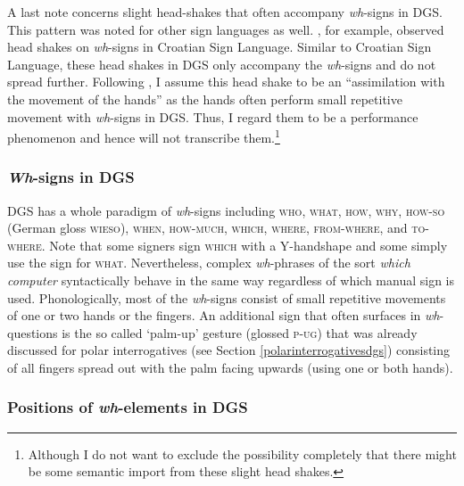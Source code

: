 A last note concerns slight head-shakes that often accompany \textit{wh}-signs in DGS. This pattern was noted for other sign languages as well. \citet[232--235]{sarac2007cross}, for example, observed head shakes on \textit{wh}-signs in Croatian Sign Language. Similar to Croatian Sign Language, these head shakes in DGS only accompany the \textit{wh}-signs and do not spread further. Following \citet[235]{sarac2007cross}, I assume this head shake to be an ``assimilation with the movement of the hands'' as the hands often perform small repetitive movement with \textit{wh}-signs in DGS. Thus, I regard them to be a performance phenomenon and hence will not transcribe them.\footnote{ Although I do not want to exclude the possibility completely that there might be some semantic import from these slight head shakes.}

\subsubsection{\textit{Wh}-signs in DGS}


DGS has a whole paradigm of \textit{wh}-signs including \textsc{who}, \textsc{what}, \textsc{how}, \textsc{why}, \textsc{how-so} (German gloss \textsc{wieso}), \textsc{when}, \textsc{how-much}, \textsc{which}, \textsc{where}, \textsc{from-where}, and \textsc{to-where}. Note that some signers sign \textsc{which} with a Y-handshape and some simply use the sign for \textsc{what}. Nevertheless, complex \textit{wh}-phrases of the sort \textit{which computer} syntactically behave in the same way regardless of which manual sign is used. Phonologically, most of the \textit{wh}-signs consist of small repetitive movements of one or two hands or the fingers. An additional sign that often surfaces in \textit{wh}-questions is the so called `palm-up' gesture (glossed \textsc{p-ug}) that was already discussed for polar interrogatives (see Section \ref{polarinterrogativesdgs}) consisting of all fingers spread out with the palm facing upwards (using one or both hands). 

\subsubsection{Positions of \textit{wh}-elements in DGS}

